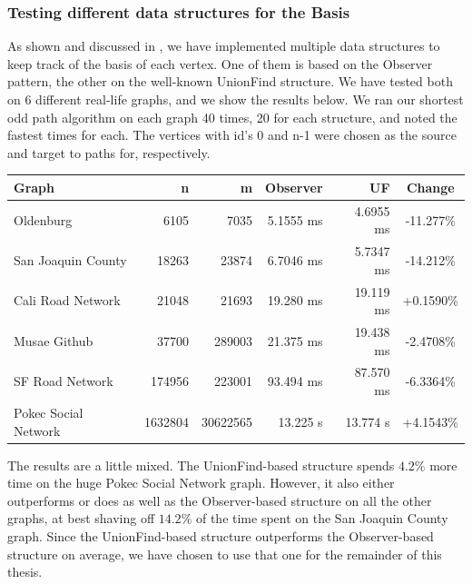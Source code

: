 \subsubsection{Testing different data structures for the Basis}
\label{subsubsection:testing-basis}
As shown and discussed in , we have implemented multiple data structures to keep track of the basis of each vertex. One of them is based on the Observer pattern, the other on the well-known UnionFind structure. We have tested both on 6 different real-life graphs, and we show the results below. We ran our shortest odd path algorithm on each graph 40 times, 20 for each structure, and noted the fastest times for each. The vertices with id's 0 and n-1 were chosen as the source and target to paths for, respectively. 
\begin{center}
    \begin{tabular}{|l | r | r | r | r | c|} 
     \hline
     Graph & n & m & Observer & UF & Change \\ [0.5ex] 
     \hline\hline
     Oldenburg & 6105 & 7035 & 5.1555 ms & 4.6955 ms & -11.277\%\\ 
     \hline
     San Joaquin County & 18263 & 23874 & 6.7046 ms & 5.7347 ms & -14.212\%\\
     \hline
     Cali Road Network & 21048 & 21693 & 19.280 ms & 19.119 ms & +0.1590\%\\
     \hline
     Musae Github \cite{graph:musae-github} & 37700 & 289003 & 21.375 ms & 19.438 ms & -2.4708\%\\
     \hline
     SF Road Network & 174956 & 223001 & 93.494 ms & 87.570 ms & -6.3364\%\\ [1ex] 
     \hline
     Pokec Social Network \cite{graph:soc-pokec} & 1632804 & 30622565 & 13.225 s & 13.774 s & +4.1543\%\\ [1ex] 
     \hline
    \end{tabular}
\end{center}


The results are a little mixed. The UnionFind-based structure spends $4.2\%$ more time on the huge Pokec Social Network graph. However, it also either outperforms or does as well as the Observer-based structure on all the other graphs, at best shaving off $14.2\%$ of the time spent on the San Joaquin County graph. Since the UnionFind-based structure outperforms the Observer-based structure on average, we have chosen to use that one for the remainder of this thesis.

